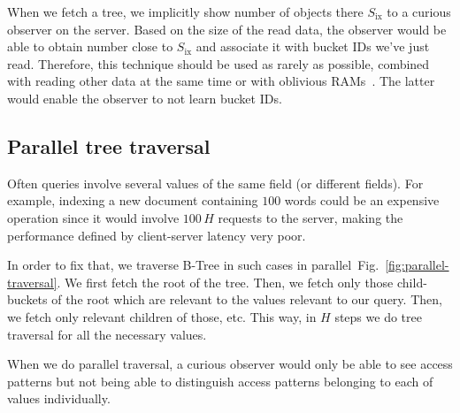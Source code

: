 \documentclass[notitlepage]{revtex4-1}
\newcommand{\figref}[1]{Fig.~\ref{#1}}
\begin{document}
When we fetch a tree, we implicitly show number of objects there $S_{\mbox{ix}}$ to a curious observer on the server.
Based on the size of the read data, the observer would be able to obtain number close to $S_{\mbox{ix}}$ and associate it with bucket IDs we've just read.
Therefore, this technique should be used as rarely as possible, combined with reading other data at the same time or with oblivious RAMs~\cite{path-oram,burst-oram,oram-multicloud,ods-wang-2014}.
The latter would enable the observer to not learn bucket IDs.

\subsection{Parallel tree traversal}

Often queries involve several values of the same field (or different fields).
For example, indexing a new document containing $100$ words could be an expensive operation since it would involve $100\,H$ requests to the server, making the performance defined by client-server latency very poor.

In order to fix that, we traverse B-Tree in such cases in parallel~\figref{fig:parallel-traversal}.
We first fetch the root of the tree.
Then, we fetch only those child-buckets of the root which are relevant to the values relevant to our query.
Then, we fetch only relevant children of those, etc.
This way, in $H$ steps we do tree traversal for all the necessary values.

When we do parallel traversal, a curious observer would only be able to see access patterns but not being able to distinguish access patterns belonging to each of values individually.
\end{document}
